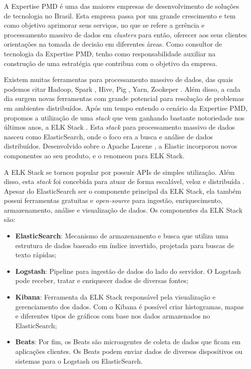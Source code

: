 A Expertise PMD é uma das maiores empresas de desenvolvimento de soluções de tecnologia no Brasil. Esta empresa passa por um grande crescimento e tem como objetivo aprimorar seus serviços, no que se refere a gerência e processamento massivo de dados em \textit{clusters} para então, oferecer aos seus clientes orientações na tomada de decisão em diferentes áreas. Como consultor de tecnologia da Expertise PMD, tenho como responsabilidade auxiliar na construção de uma estratégia que contribua com o objetivo da empresa.

Existem muitas ferramentas para processamento massivo de dados, das quais podemos citar Hadoop, Spark \cite{hazarika2017performance}, Hive, Pig \cite{fuad2014processing}, Yarn, Zookeper \cite{frampton2015storing}. Além disso, a cada dia surgem novas ferramentas com grande potencial para resolução de problemas em ambientes distribuídos. Após um tempo entendo o cenário da Expertise PMD, propomos a utilização de uma \textit{stack} que vem ganhando bastante notoriedade nos últimos anos, a ELK Stack \cite{chhajed2015learning}. Esta \textit{stack} para processamento massivo de dados nasceu como ElasticSearch, onde o foco era a busca e análise de dados distribuídos. Desenvolvido sobre o Apache Lucene \cite{lucene2010apache}, a Elastic incorporou novos componentes ao seu produto, e o renomeou para ELK Stack.

A ELK Stack se tornou popular por possuir APIs de simples utilização. Além disso, esta \textit{stack} foi concebida para atuar de forma escalável, veloz e distribuída \cite{son2017performance}. Apesar do ElasticSearch ser o componente principal da ELK Stack, ela também possui ferramentas gratuitas e \textit{open-source} para ingestão, enriquecimento, armazenamento, análise e visualização de dados. Os componentes da ELK Stack são:

\begin{itemize}
    \item \textbf{ElasticSearch}: Mecanismo de armazenamento e busca que utiliza uma estrutura de dados baseado em índice invertido, projetada para buscas de texto rápidas;
    
    \item \textbf{Logstash}: Pipeline para ingestão de dados do lado do servidor. O Logstash pode receber, tratar e enriquecer dados de diversas fontes;
    
    \item \textbf{Kibana}: Ferramenta da ELK Stack responsável pela visualização e gerenciamento dos dados. Com o Kibana é possível criar histogramas, mapas e diferentes tipos de gráficos com base nos dados armazenados no ElasticSearch;
    
    \item \textbf{Beats}: Por fim, os Beats são microagentes de coleta de dados que ficam em aplicações clientes. Os Beats podem enviar dados de diversos dispositivos ou sistemas para o Logstash ou ElasticSearch.
    
\end{itemize}

